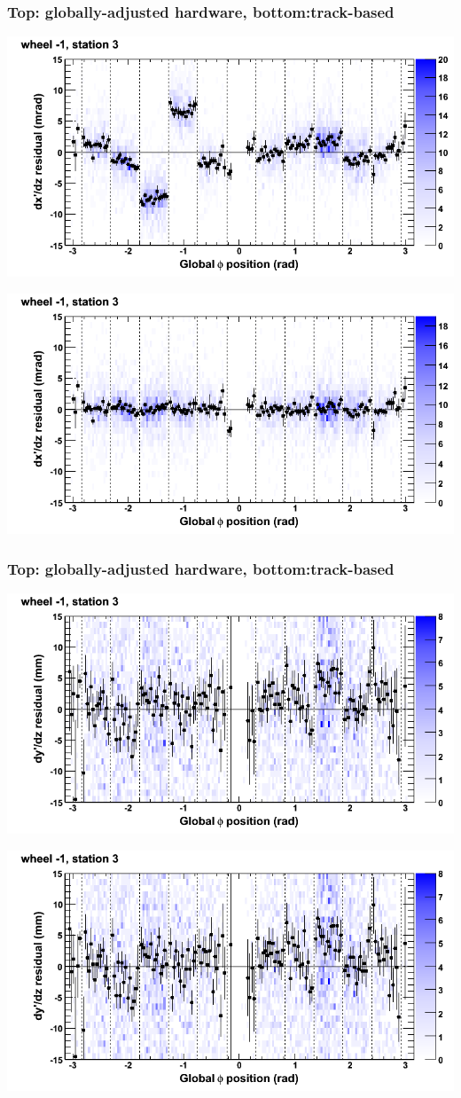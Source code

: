 \documentclass[compress]{beamer}
\begin{document}
\begin{frame}
\frametitle{Top: globally-adjusted hardware, bottom:track-based}
\includegraphics[width=0.7\linewidth]{NOV4_mapplots_HW/DTvsphi_st3whB_dxdz.png}

\includegraphics[width=0.7\linewidth]{NOV4_mapplots/DTvsphi_st3whB_dxdz.png}
\end{frame}

\begin{frame}
\frametitle{Top: globally-adjusted hardware, bottom:track-based}
\includegraphics[width=0.7\linewidth]{NOV4_mapplots_HW/DTvsphi_st3whB_dydz.png}

\includegraphics[width=0.7\linewidth]{NOV4_mapplots/DTvsphi_st3whB_dydz.png}
\end{frame}
\end{document}

